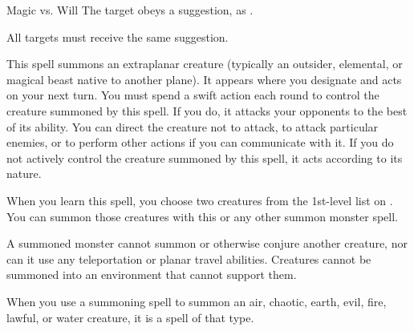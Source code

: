 \begin{spellheader}
    \begin{spelltargetinginfo}
    \end{spelltargetinginfo}
\end{spellheader}
\begin{spellcontent}
    \begin{spelleffects}
        \begin{spellattack}{Magic vs. Will}
            \spelleffect The target obeys a suggestion, as .
        \end{spellattack}
        \spelldur{\durmed}
    \end{spelleffects}
\end{spellcontent}
\begin{spellfooter}
    \spellnotes All targets must receive the same suggestion.
\end{spellfooter}

\hypertarget{spell:summon monster}{}
\begin{spellheader}
\end{spellheader}
\begin{spellcontent}
    \spelleffect This spell summons an extraplanar creature (typically an outsider, elemental, or magical beast native to another plane). It appears where you designate and acts on your next turn. You must spend a swift action each round to control the creature summoned by this spell. If you do, it attacks your opponents to the best of its ability. You can direct the creature not to attack, to attack particular enemies, or to perform other actions if you can communicate with it. If you do not actively control the creature summoned by this spell, it acts according to its nature.
    \par When you learn this spell, you choose two creatures from the 1st-level list on . You can summon those creatures with this or any other summon monster spell.
    \par A summoned monster cannot summon or otherwise conjure another creature, nor can it use any teleportation or planar travel abilities. Creatures cannot be summoned into an environment that cannot support them.
    \par When you use a summoning spell to summon an air, chaotic, earth, evil, fire, lawful, or water creature, it is a spell of that type.
    \spelldur{\durshort \dismissable}
\end{spellcontent}
\begin{spellfooter}

\end{spellfooter}

